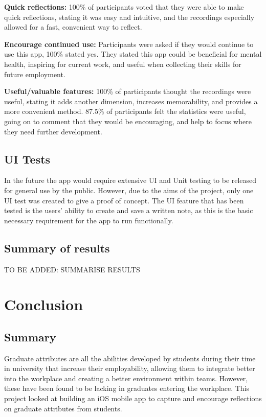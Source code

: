 \documentclass{l4proj}
\begin{document}
\textbf{Quick reflections:} 100\% of participants voted that they were able to make quick reflections, stating it was easy and intuitive, and the recordings especially allowed for a fast, convenient way to reflect.

\textbf{Encourage continued use:} Participants were asked if they would continue to use this app, 100\% stated yes. They stated this app could be beneficial for mental health, inspiring for current work, and useful when collecting their skills for future employment. 

\textbf{Useful/valuable features:} 100\% of participants thought the recordings were useful, stating it adds another dimension, increases memorability, and provides a more convenient method. 87.5\% of participants felt the statistics were useful, going on to comment that they would be encouraging, and help to focus where they need further development.


\section{UI Tests}

In the future the app would require extensive UI and Unit testing to be released for general use by the public. However, due to the aims of the project, only one UI test was created to give a proof of concept. The UI feature that has been tested is the users' ability to create and save a written note, as this is the basic necessary requirement for the app to run functionally. 

\section{Summary of results}

TO BE ADDED: SUMMARISE RESULTS


\chapter{Conclusion}  

\section{Summary}

Graduate attributes are all the abilities developed by students during their time in university that increase their employability, allowing them to integrate better into the workplace and creating a better environment within teams. However, these have been found to be lacking in graduates entering the workplace. This project looked at building an iOS mobile app to capture and encourage reflections on graduate attributes from students. 
\end{document}
